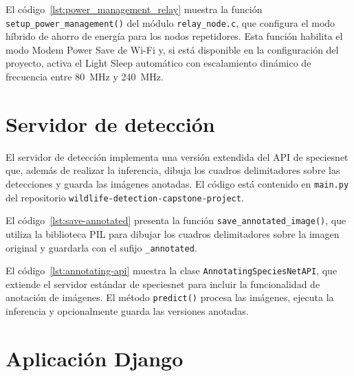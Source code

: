 \documentclass[a4paper, 12pt]{report}
\begin{document}
El código~\ref{lst:power_management_relay} muestra la función
\texttt{setup\_power\_management()} del módulo \texttt{relay\_node.c}, que configura
el modo híbrido de ahorro de energía para los nodos repetidores. Esta función habilita
el modo Modem Power Save de Wi-Fi y, si está disponible en la configuración del proyecto,
activa el Light Sleep automático con escalamiento dinámico de frecuencia entre
\qty{80}{\mega\hertz} y \qty{240}{\mega\hertz}.



\section{Servidor de detección}

El servidor de detección implementa una versión extendida del API de \gls{speciesnet}
que, además de realizar la \gls{inferencia}, dibuja los cuadros delimitadores
sobre las detecciones y guarda las imágenes anotadas. El código está contenido
en \texttt{main.py} del repositorio \texttt{wildlife-\allowbreak detection-\allowbreak capstone-\allowbreak project}.

El código~\ref{lst:save-annotated} presenta la función \texttt{save\_annotated\_image()},
que utiliza la biblioteca PIL para dibujar los cuadros delimitadores sobre la
imagen original y guardarla con el sufijo \texttt{\_annotated}.



El código~\ref{lst:annotating-api} muestra la clase \texttt{AnnotatingSpeciesNetAPI},
que extiende el servidor estándar de \gls{speciesnet} para incluir la funcionalidad
de anotación de imágenes. El método \texttt{predict()} procesa las imágenes,
ejecuta la \gls{inferencia} y opcionalmente guarda las versiones anotadas.



\section{Aplicación Django}
\end{document}
